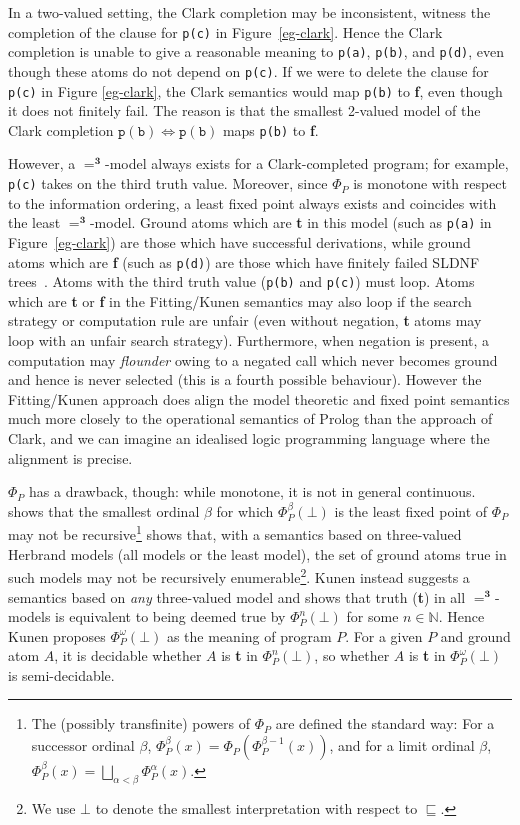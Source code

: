 \documentclass{tlp}
\newcommand{\Tri}{\ensuremath{\mathbf{3}}}
\newcommand{\nat}{\mathbb{N}}
\begin{document}
In a two-valued setting, the Clark completion may be inconsistent,
witness the completion of the clause for \verb!p(c)! in
Figure~\ref{eg-clark}.
Hence the Clark completion is unable to give a reasonable meaning to
\texttt{p(a)}, \texttt{p(b)}, and \texttt{p(d)}, even though these atoms
do not depend on \texttt{p(c)}.
If we were to delete the clause for \texttt{p(c)} in Figure
\ref{eg-clark}, the Clark semantics would map \texttt{p(b)} to \textbf{f},
even though it does not finitely fail.   
The reason is that the smallest 2-valued model of the Clark completion
$\mathtt{p(b)} \Leftrightarrow \mathtt{p(b)}$ maps \texttt{p(b)} to
\textbf{f}.

However, a $=^\Tri$-model always exists for a Clark-completed program;
for example, \texttt{p(c)} takes on the third truth value.  
Moreover, since $\Phi_P$ is monotone with respect to the information
ordering, a least fixed point always exists and coincides with
the least $=^{\Tri}$-model.
Ground atoms which are \textbf{t} in this model 
(such as \texttt{p(a)} in Figure~\ref{eg-clark})
are those which have successful derivations, while 
ground atoms which are \textbf{f} (such as \texttt{p(d)}) 
are those which have finitely failed SLDNF trees~\cite{Cla78}.
Atoms with the third truth value (\texttt{p(b)} and \texttt{p(c)})
must loop.  
Atoms which are \textbf{t}
or \textbf{f} in the Fitting/Kunen semantics may also loop if the search
strategy or computation rule are unfair (even without negation, \textbf{t}
atoms may loop with an unfair search strategy).  Furthermore, when
negation is present, a computation may \emph{flounder} owing to a negated
call which never becomes ground and hence is never selected (this is a fourth
possible behaviour).  However the Fitting/Kunen
approach does align the model theoretic and fixed point semantics much more
closely to the operational semantics of Prolog than the approach of
Clark, and we can imagine an idealised logic programming language where
the alignment is precise.

$\Phi_P$ has a drawback, though: while monotone, it is not in general 
continuous.
 shows that the smallest ordinal $\beta$ for which 
$\Phi_P^\beta(\bot)$ is the least fixed point of $\Phi_P$ may not be
recursive\footnote{The (possibly transfinite) powers of $\Phi_P$ are
defined the standard way: For a successor ordinal $\beta$,
$\Phi_P^{\beta}(x) = \Phi_P(\Phi_P^{\beta - 1}(x))$, 
and for a limit ordinal $\beta$, 
$\Phi_P^{\beta}(x) = \bigsqcup _{\alpha < \beta} \Phi_P^{\alpha}(x)$.}
 shows that, with a semantics based on three-valued
Herbrand models (all models or the least model), the set of ground
atoms true in such models may not be recursively enumerable\footnote{We use $\bot$ to denote the smallest interpretation with respect to 
$\sqsubseteq$.}.
Kunen instead suggests a semantics based on \emph{any} three-valued
model and shows that truth (\textbf{t}) in all $=^\Tri$-models is
equivalent to being deemed true by $\Phi_P^n(\bot)$ for some $n \in \nat$.
Hence Kunen proposes $\Phi_P^\omega(\bot)$ as the meaning of program $P$.
For a given $P$ and ground atom $A$, it is decidable whether
$A$ is \textbf{t} in $\Phi_P^n(\bot)$, so whether $A$ is \textbf{t} in 
$\Phi_P^\omega(\bot)$ is semi-decidable.
\end{document}

